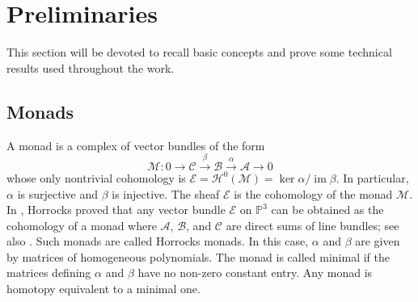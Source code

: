 \documentclass[twoside,reqno]{amsart}
\theoremstyle{plain}
\newcommand{\lra}{\longrightarrow}
\newcommand{\p}[1]{\mathbb{P}^{#1}}
\DeclareMathOperator{\im}{im}
\newcommand{\E}{\mathcal{E}}
\newcommand{\cA}{\mathcal{A}}
\newcommand{\cB}{\mathcal{B}}
\newcommand{\cC}{\mathcal{C}}
\newcommand{\cH}{\mathcal{H}}
\newcommand{\cM}{\mathcal{M}}
\begin{document}
\section{Preliminaries}\label{section2}
This section will be devoted to recall basic concepts and prove some technical results used throughout the work. 

\subsection{Monads}\label{sub-monads}
A monad is a complex of vector bundles of the form 
\[
\cM : 0 \lra \cC \stackrel{\beta}{\lra} \cB \stackrel{\alpha}{\lra} \cA \lra 0
\]
whose only nontrivial cohomology is $\E = \cH^0(\cM) = \ker \alpha/\im \beta$. In particular, $\alpha$ is surjective and $\beta$ is injective. The sheaf $\E$ is the cohomology of the monad $\cM$. In \cite{Horrocks-constr}, Horrocks proved that any vector bundle $\E$ on $\p3$ can be obtained as the cohomology of a monad where $\cA$, $\cB$, and $\cC$ are direct sums of line bundles; see also \cite{Barth-Hulek-monads,Rao-coh}. Such monads are called Horrocks monads. In this case, $\alpha$ and $\beta$ are given by matrices of homogeneous polynomials. The monad is called minimal if the matrices defining $\alpha$ and $\beta$ have no non-zero constant entry. Any monad is homotopy equivalent to a minimal one. 
\end{document}
